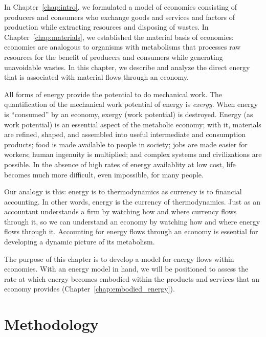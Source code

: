 

In Chapter~\ref{chap:intro}, we formulated a model of economies
consisting of producers and consumers who exchange
goods and services and factors of production 
while extracting resources and disposing of wastes. 
In Chapter~\ref{chap:materials}, we established the material basis of economies: 
economies are analogous to organisms with metabolisms that processes
raw resources for the benefit of producers and consumers 
while generating unavoidable wastes.
In this chapter, we describe and analyze the 
direct energy
that is associated with material flows
through an economy.

All forms of energy provide the potential to do mechanical work. The 
quantification of the mechanical work potential of energy is \emph{exergy}.
When energy is ``consumed'' by an economy, exergy (work potential) is destroyed. 
Energy (as work potential) 
is an essential aspect of the metabolic economy;
with it, materials are refined, shaped, and assembled
into useful intermediate and consumption products; 
food is made available to people in society; 
jobs are made easier for workers;
human ingenuity is multiplied;
and complex systems and civilizations are possible.
In the absence of high rates of energy availablity at low cost,
life becomes much more difficult, even impossible, for many people.

Our analogy is this: 
energy is to thermodynamics as currency is to financial accounting.
In other words, energy is the currency of thermodynamics.
Just as an accountant understands a firm by watching how and where
currency flows through it, so we can understand an economy by watching
how and where energy flows through it.
Accounting for energy flows through an economy
is essential for developing a dynamic picture 
of its metabolism.

The purpose of this chapter is to develop 
a model for energy flows within economies.
With an energy model in hand, we will be positioned 
to assess the rate at which
energy becomes embodied within the products and 
services that an economy provides
(Chapter~\ref{chap:embodied_energy}).


\section{Methodology}
\label{sec:energy_methodology}

